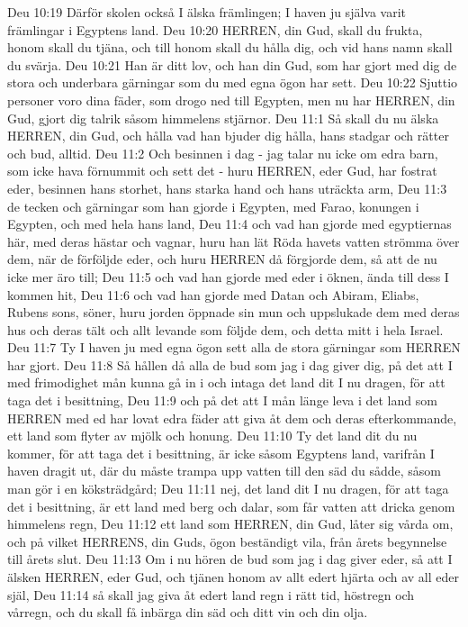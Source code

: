 Deu 10:19  Därför skolen också I älska främlingen; I haven ju själva varit främlingar i Egyptens land.
Deu 10:20  HERREN, din Gud, skall du frukta, honom skall du tjäna, och till honom skall du hålla dig, och vid hans namn skall du svärja.
Deu 10:21  Han är ditt lov, och han din Gud, som har gjort med dig de stora och underbara gärningar som du med egna ögon har sett.
Deu 10:22  Sjuttio personer voro dina fäder, som drogo ned till Egypten, men nu har HERREN, din Gud, gjort dig talrik såsom himmelens stjärnor.
Deu 11:1  Så skall du nu älska HERREN, din Gud, och hålla vad han bjuder dig hålla, hans stadgar och rätter och bud, alltid.
Deu 11:2  Och besinnen i dag - jag talar nu icke om edra barn, som icke hava förnummit och sett det - huru HERREN, eder Gud, har fostrat eder, besinnen hans storhet, hans starka hand och hans uträckta arm,
Deu 11:3  de tecken och gärningar som han gjorde i Egypten, med Farao, konungen i Egypten, och med hela hans land,
Deu 11:4  och vad han gjorde med egyptiernas här, med deras hästar och vagnar, huru han lät Röda havets vatten strömma över dem, när de förföljde eder, och huru HERREN då förgjorde dem, så att de nu icke mer äro till;
Deu 11:5  och vad han gjorde med eder i öknen, ända till dess I kommen hit,
Deu 11:6  och vad han gjorde med Datan och Abiram, Eliabs, Rubens sons, söner, huru jorden öppnade sin mun och uppslukade dem med deras hus och deras tält och allt levande som följde dem, och detta mitt i hela Israel.
Deu 11:7  Ty I haven ju med egna ögon sett alla de stora gärningar som HERREN har gjort.
Deu 11:8  Så hållen då alla de bud som jag i dag giver dig, på det att I med frimodighet mån kunna gå in i och intaga det land dit I nu dragen, för att taga det i besittning,
Deu 11:9  och på det att I mån länge leva i det land som HERREN med ed har lovat edra fäder att giva åt dem och deras efterkommande, ett land som flyter av mjölk och honung.
Deu 11:10  Ty det land dit du nu kommer, för att taga det i besittning, är icke såsom Egyptens land, varifrån I haven dragit ut, där du måste trampa upp vatten till den säd du sådde, såsom man gör i en köksträdgård;
Deu 11:11  nej, det land dit I nu dragen, för att taga det i besittning, är ett land med berg och dalar, som får vatten att dricka genom himmelens regn,
Deu 11:12  ett land som HERREN, din Gud, låter sig vårda om, och på vilket HERRENS, din Guds, ögon beständigt vila, från årets begynnelse till årets slut.
Deu 11:13  Om i nu hören de bud som jag i dag giver eder, så att I älsken HERREN, eder Gud, och tjänen honom av allt edert hjärta och av all eder själ,
Deu 11:14  så skall jag giva åt edert land regn i rätt tid, höstregn och vårregn, och du skall få inbärga din säd och ditt vin och din olja.
